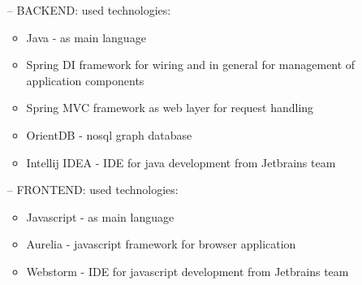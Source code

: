 \documentclass[12pt,a4paper,titlepage]{article}
\begin{document}
\begin{itemize}

\item[--] BACKEND:
used technologies:
\begin{itemize}
\item Java - as main language
\item Spring DI framework for wiring and in general for management of application components
\item Spring MVC framework as web layer for request handling
\item OrientDB - nosql graph database
\item Intellij IDEA - IDE for java development from Jetbrains team
\end{itemize}

\item[--] FRONTEND:
used technologies:
\begin{itemize}
\item Javascript - as main language
\item Aurelia - javascript framework for browser application
\item Webstorm - IDE for javascript development from Jetbrains team
\end{itemize}

\end{itemize}
\end{document}
